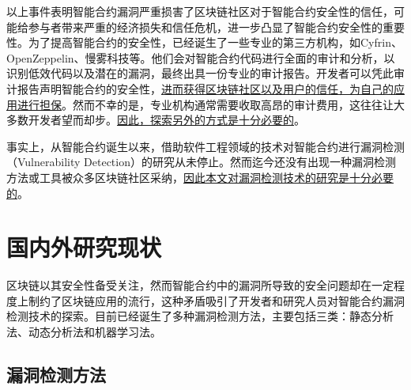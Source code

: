 以上事件表明智能合约漏洞严重损害了区块链社区对于智能合约安全性的信任，可能给参与者带来严重的经济损失和信任危机，进一步凸显了智能合约安全性的重要性。为了提高智能合约的安全性，已经诞生了一些专业的第三方机构，如Cyfrin、OpenZeppelin、慢雾科技等。他们会对智能合约代码进行全面的审计和分析，以识别低效代码以及潜在的漏洞，最终出具一份专业的审计报告。开发者可以凭此审计报告声明智能合约的安全性，\underline{进而获得区块链社区以及用户的信任，为自己的应用进行担保}。然而不幸的是，专业机构通常需要收取高昂的审计费用，这往往让大多数开发者望而却步。\underline{因此，探索另外的方式是十分必要的}。


事实上，从智能合约诞生以来，借助软件工程领域的技术对智能合约进行漏洞检测（Vulnerability Detection）的研究从未停止。然而迄今还没有出现一种漏洞检测方法或工具被众多区块链社区采纳，\underline{因此本文对漏洞检测技术的研究是十分必要的}。


\section{国内外研究现状}
区块链以其安全性备受关注，然而智能合约中的漏洞所导致的安全问题却在一定程度上制约了区块链应用的流行，这种矛盾吸引了开发者和研究人员对智能合约漏洞检测技术的探索。目前已经诞生了多种漏洞检测方法，主要包括三类：静态分析法、动态分析法和机器学习法。

\subsection{漏洞检测方法}

